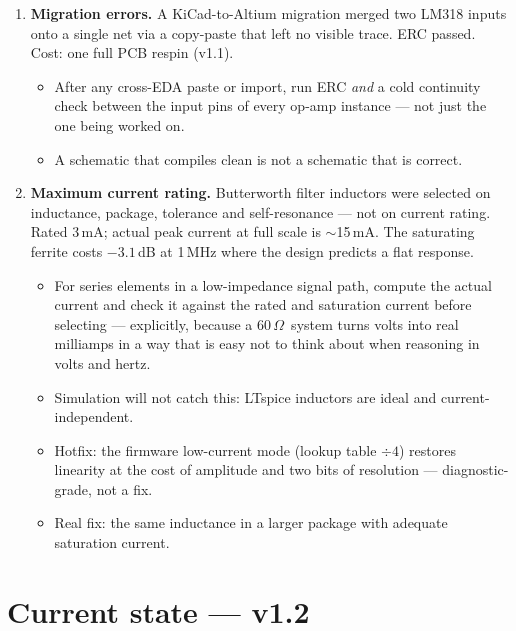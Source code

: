 \documentclass[11pt,a4paper]{article}
\newcommand{\ohm}{\ensuremath{\Omega}}
\begin{document}
\begin{enumerate}[label=\textbf{\arabic*.},leftmargin=2.1em]
    \item \textbf{Migration errors.} A KiCad-to-Altium migration merged two LM318 inputs
          onto a single net via a copy-paste that left no visible trace. ERC passed. Cost: one
          full PCB respin (v1.1).
          \begin{itemize}[topsep=0.4em,itemsep=0.35em]
              \item After any cross-EDA paste or import, run ERC \emph{and} a cold continuity check
                    between the input pins of every op-amp instance --- not just the one being worked on.
              \item A schematic that compiles clean is not a schematic that is correct.
          \end{itemize}

    \item \textbf{Maximum current rating.} Butterworth filter inductors were selected on
          inductance, package, tolerance and self-resonance --- not on current rating. Rated
          3\,mA; actual peak current at full scale is $\sim$15\,mA. The saturating ferrite costs
          $-3.1$\,dB at 1\,MHz where the design predicts a flat response.
          \begin{itemize}[topsep=0.4em,itemsep=0.35em]
              \item For series elements in a low-impedance signal path, compute the actual current
                    and check it against the rated and saturation current before selecting --- explicitly,
                    because a 60\,\ohm\ system turns volts into real milliamps in a way that is easy not to
                    think about when reasoning in volts and hertz.
              \item Simulation will not catch this: LTspice inductors are ideal and
                    current-independent.
              \item Hotfix: the firmware low-current mode (lookup table $\div4$) restores linearity
                    at the cost of amplitude and two bits of resolution --- diagnostic-grade, not a fix.
              \item Real fix: the same inductance in a larger package with adequate saturation
                    current.
          \end{itemize}
\end{enumerate}

\section{Current state --- v1.2}
\label{sec:current}
\end{document}
